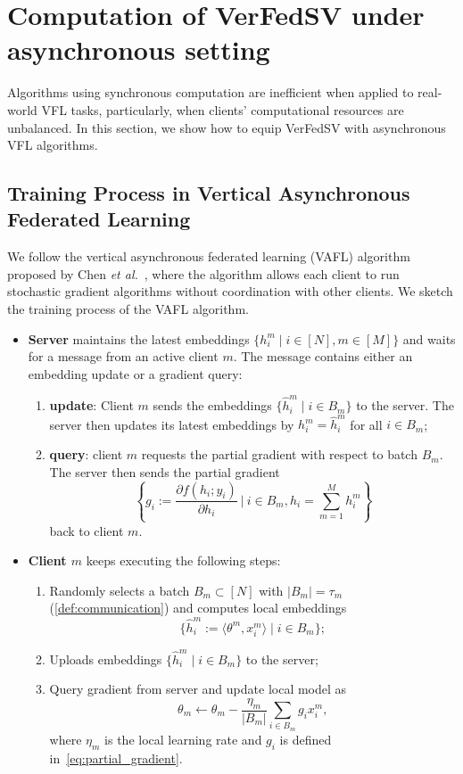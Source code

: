 \section{Computation of VerFedSV under asynchronous setting} \label{sec:8.6}
Algorithms using synchronous computation are inefficient when applied to real-world VFL tasks, particularly, when clients' computational resources are unbalanced. In this section, we show how to equip VerFedSV with asynchronous VFL algorithms.

\subsection{Training Process in Vertical Asynchronous Federated Learning}
We follow the vertical asynchronous federated learning (VAFL) algorithm proposed by Chen \textit{et al.}~\cite{chen2020vafl}, where the algorithm allows each client to run stochastic gradient algorithms without coordination with other clients. We sketch the training process of the VAFL algorithm. 
\begin{itemize}
\item \textbf{Server} maintains the latest embeddings $\{h_i^m \mid i \in [N], m \in [M]\}$ and waits for a message from an active client $m$. The message contains either an embedding update or a gradient query:
\begin{enumerate}
  \item \textbf{update}: Client $m$ sends the embeddings $\{\hat h_i^m \mid i \in B_m\}$ to the server. The server then updates its latest embeddings by $h_i^m = \hat h_i^m$ for all  $i \in B_m$;
  \item \textbf{query}: client $m$ requests the partial gradient with respect to batch $B_m$. The server then sends the partial gradient
  \begin{equation} \label{eq:partial_gradient}
      \left\{ g_i := \frac{\partial f(h_i; y_i)}{\partial h_i} ~\bigg\vert~ i \in B_m, h_i = \sum_{m=1}^M h_i^m \right\}
  \end{equation}
  back to client $m$. 
\end{enumerate}
\item \textbf{Client $m$} keeps executing the following steps:
\begin{enumerate}
  \item Randomly selects a batch $B_m \subset [N]$ with $|B_m| = \tau_m$ (\autoref{def:communication}) and computes local embeddings 
  \[\{\hat h_i^m := \langle \theta^m, x^m_i \rangle \mid i \in B_m\};\]
  \item Uploads embeddings $\{\hat h_i^m \mid i \in B_m\}$ to the server;
  \item Query gradient from server and update local model as
  \[\theta_m \leftarrow \theta_m -  \frac{\eta_m}{|B_m|}\sum_{i\in B_m} g_i x_i^m,\]
  where $\eta_m$ is the local learning rate and $g_i$ is defined in~\eqref{eq:partial_gradient}. 
\end{enumerate}
\end{itemize} 

